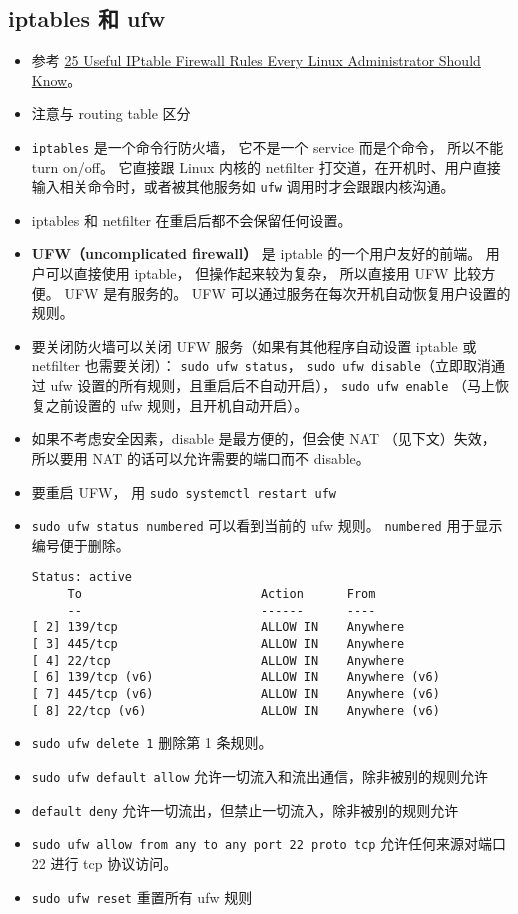 \subsection{iptables 和 ufw}
\begin{itemize}
\item 参考 \href{https://www.tecmint.com/linux-iptables-firewall-rules-examples-commands/}{25 Useful IPtable Firewall Rules Every Linux Administrator Should Know}。
\item 注意与 routing table 区分
\item \verb|iptables| 是一个命令行防火墙， 它不是一个 service 而是个命令， 所以不能 turn on/off。 它直接跟 Linux 内核的 netfilter 打交道，在开机时、用户直接输入相关命令时，或者被其他服务如 \verb`ufw` 调用时才会跟跟内核沟通。
\item iptables 和 netfilter 在重启后都不会保留任何设置。
\item \textbf{UFW（uncomplicated firewall）} 是 iptable 的一个用户友好的前端。 用户可以直接使用 iptable， 但操作起来较为复杂， 所以直接用 UFW 比较方便。 UFW 是有服务的。 UFW 可以通过服务在每次开机自动恢复用户设置的规则。
\item 要关闭防火墙可以关闭 UFW 服务（如果有其他程序自动设置 iptable 或 netfilter 也需要关闭）： \verb|sudo ufw status|， \verb|sudo ufw disable|（立即取消通过 ufw 设置的所有规则，且重启后不自动开启）， \verb|sudo ufw enable| （马上恢复之前设置的 ufw 规则，且开机自动开启）。
\item 如果不考虑安全因素，disable 是最方便的，但会使 NAT （见下文）失效， 所以要用 NAT 的话可以允许需要的端口而不 disable。
\item 要重启 UFW， 用 \verb|sudo systemctl restart ufw|
\item \verb`sudo ufw status numbered` 可以看到当前的 ufw 规则。 \verb`numbered` 用于显示编号便于删除。
\begin{lstlisting}[language=none]
Status: active
     To                         Action      From
     --                         ------      ----
[ 2] 139/tcp                    ALLOW IN    Anywhere
[ 3] 445/tcp                    ALLOW IN    Anywhere
[ 4] 22/tcp                     ALLOW IN    Anywhere
[ 6] 139/tcp (v6)               ALLOW IN    Anywhere (v6)
[ 7] 445/tcp (v6)               ALLOW IN    Anywhere (v6)
[ 8] 22/tcp (v6)                ALLOW IN    Anywhere (v6)
\end{lstlisting}
\item \verb`sudo ufw delete 1` 删除第 1 条规则。
\item \verb`sudo ufw default allow` 允许一切流入和流出通信，除非被别的规则允许
\item \verb`default deny` 允许一切流出，但禁止一切流入，除非被别的规则允许
\item \verb`sudo ufw allow from any to any port 22 proto tcp` 允许任何来源对端口 22 进行 tcp 协议访问。
\item \verb`sudo ufw reset` 重置所有 ufw 规则
\end{itemize}

